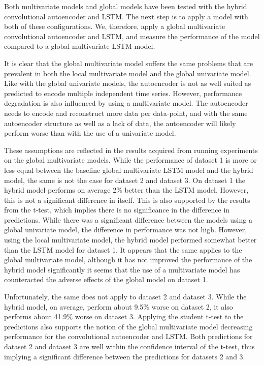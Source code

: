 Both multivariate models and global models have been tested with the hybrid convolutional autoencoder and LSTM.
The next step is to apply a model with both of these configurations.
We, therefore, apply a global multivariate convolutional autoencoder and LSTM, and measure the performance of the model
compared to a global multivariate LSTM model.

It is clear that the global multivariate model suffers the same problems that are prevalent in both the local multivariate model
and the global univariate model.
Like with the global univariate models, the autoencoder is not as well suited as predicted to encode multiple independent time series.
However, performance degradation is also influenced by using a multivariate model.
The autoencoder needs to encode and reconstruct more data per data-point, and with the same autoencoder structure
as well as a lack of data, the autoencoder will likely perform worse than with the use of a univariate model.

These assumptions are reflected in the results acquired from running experiments on the global multivariate models.
While the performance of dataset 1 is more or less equal between the baseline global multivariate LSTM model and the hybrid model,
the same is not the case for dataset 2 and dataset 3.
On dataset 1 the hybrid model performs on average 2\% better than the LSTM model. However, this is not a significant difference in itself.
This is also supported by the results from the t-test, which implies there is no significance in the difference in predictions.
While there was a significant difference between the models using a global univariate model, the difference in performance was not high.
However, using the local multivariate model, the hybrid model performed somewhat better than the LSTM model for dataset 1.
It appears that the same applies to the global multivariate model, although it has not improved the performance of the hybrid model significantly
it seems that the use of a multivariate model has counteracted the adverse effects of the global model on dataset 1.

Unfortunately, the same does not apply to dataset 2 and dataset 3.
While the hybrid model, on average, perform about 9.5\% worse on dataset 2, it also performs about 41.9\% worse on dataset 3.
Applying the student t-test to the predictions also supports the notion of the global multivariate model decreasing performance for the
convolutional autoencoder and LSTM.
Both predictions for dataset 2 and dataset 3 are well within the confidence interval of the t-test,
thus implying a significant difference between the predictions for datasets 2 and 3.


